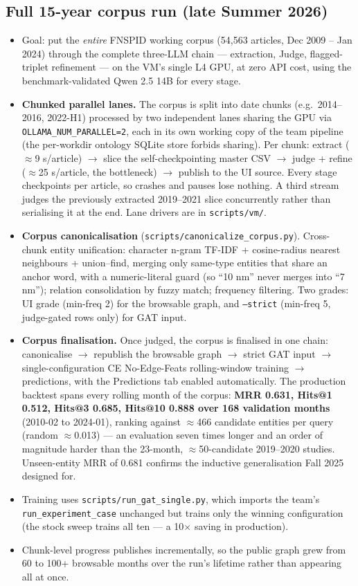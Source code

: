 \documentclass[11pt]{article}
\begin{document}
\subsection{Full 15-year corpus run (late Summer 2026)}
\begin{itemize}
  \item Goal: put the \emph{entire} FNSPID working corpus (54{,}563 articles, Dec 2009 -- Jan 2024) through the complete three-LLM chain --- extraction, Judge, flagged-triplet refinement --- on the VM's single L4 GPU, at zero API cost, using the benchmark-validated Qwen 2.5 14B for every stage.
  \item \textbf{Chunked parallel lanes.} The corpus is split into date chunks (e.g.\ 2014--2016, 2022-H1) processed by two independent lanes sharing the GPU via \texttt{OLLAMA\_NUM\_PARALLEL=2}, each in its own working copy of the team pipeline (the per-workdir ontology SQLite store forbids sharing). Per chunk: extract (\(\approx\)9 s/article) \(\to\) slice the self-checkpointing master CSV \(\to\) judge + refine (\(\approx\)25 s/article, the bottleneck) \(\to\) publish to the UI source. Every stage checkpoints per article, so crashes and pauses lose nothing. A third stream judges the previously extracted 2019--2021 slice concurrently rather than serialising it at the end. Lane drivers are in \texttt{scripts/vm/}.
  \item \textbf{Corpus canonicalisation} (\texttt{scripts/canonicalize\_corpus.py}). Cross-chunk entity unification: character n-gram TF-IDF + cosine-radius nearest neighbours + union--find, merging only same-type entities that share an anchor word, with a numeric-literal guard (so ``10 nm'' never merges into ``7 nm''); relation consolidation by fuzzy match; frequency filtering. Two grades: UI grade (min-freq 2) for the browsable graph, and \texttt{--strict} (min-freq 5, judge-gated rows only) for GAT input.
  \item \textbf{Corpus finalisation.} Once judged, the corpus is finalised in one chain: canonicalise \(\to\) republish the browsable graph \(\to\) strict GAT input \(\to\) single-configuration CE No-Edge-Feats rolling-window training \(\to\) predictions, with the Predictions tab enabled automatically. The production backtest spans every rolling month of the corpus: \textbf{MRR 0.631, Hits@1 0.512, Hits@3 0.685, Hits@10 0.888 over 168 validation months} (2010-02 to 2024-01), ranking against \(\approx\)466 candidate entities per query (random \(\approx\)0.013) --- an evaluation seven times longer and an order of magnitude harder than the 23-month, \(\approx\)50-candidate 2019--2020 studies. Unseen-entity MRR of 0.681 confirms the inductive generalisation Fall 2025 designed for.
  \item Training uses \texttt{scripts/run\_gat\_single.py}, which imports the team's \texttt{run\_experiment\_case} unchanged but trains only the winning configuration (the stock sweep trains all ten --- a 10\(\times\) saving in production).
  \item Chunk-level progress publishes incrementally, so the public graph grew from 60 to 100+ browsable months over the run's lifetime rather than appearing all at once.
\end{itemize}
\end{document}
